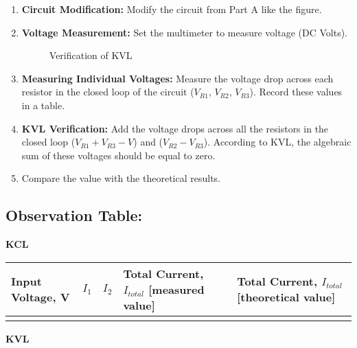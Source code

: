 \begin{enumerate}
    \item \textbf{Circuit Modification:} Modify the circuit from Part A like the figure.

    \item \textbf{Voltage Measurement: }Set the multimeter to measure voltage (DC Volts).

    \begin{figure}[H]
        \centering
        
        \caption{Verification of KVL}
        \label{fig:kvl}
    \end{figure}

    \item \textbf{Measuring Individual Voltages:} Measure the voltage drop across each resistor in the closed loop of the circuit ($V_{R1}$, $V_{R2}$, $V_{R3}$). Record these values in a table.

    \item \textbf{KVL Verification:} Add the voltage drops across all the resistors in the closed loop ($V_{R1} + V_{R3} - V$) and ($V_{R2} - V_{R3}$). According to KVL, the algebraic sum of these voltages should be equal to zero.

    \item Compare the value with the theoretical results.

\end{enumerate}

\subsection*{Observation Table:}

\noindent \textbf{KCL}

\begin{table}[h]
    \centering
    \begin{tabular}{m{1.5 cm}|m{1.5 cm}|m{1.5 cm}|m{3.5 cm}|m{3.5 cm}}
        \hline
        Input Voltage, V & $I_1$ & $I_2$ & Total Current, $I_{total}$ [measured value] & Total Current, $I_{total}$ [theoretical value] \\
        \hline
         &   &  &  &  \\
        \hline

    \end{tabular}

    \label{tab:kcl}
\end{table}

\noindent \textbf{KVL}

